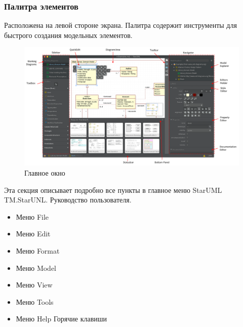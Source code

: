 \documentclass[a4paper,12pt]{report}
\newcommand{\staruml}{StarUML\,\tm}
\begin{document}
\subsubsection*{Палитра элементов}
Расположена на левой стороне экрана. Палитра содержит инструменты для быстрого создания
модельных элементов.
\newpage
\begin{figure}[htbp]
	\centering
	\includegraphics[width=\linewidth]{images/mainwindow}
	\caption{Главное окно}
	\label{fig:mainwindow}
\end{figure}

Эта секция описывает подробно все пункты в главное меню \staruml TM.StarUNL. Руководство пользователя.
\begin{itemize}
	\item Меню File
	\item Меню Edit
	\item Меню Format
	\item Меню Model
	\item Меню View
	\item Меню Tools
	\item Меню Help
	Горячие клавиши
\end{itemize}
\newpage
\end{document}
